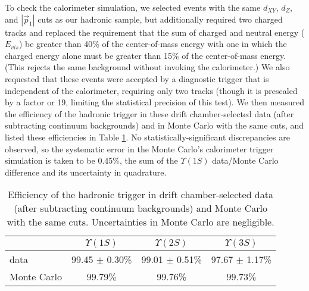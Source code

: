 \documentclass[aps,prd,preprint,superscriptaddress,tightenlines,nofootinbib,floatfix]{revtex4}
\begin{document}
To check the calorimeter simulation, we selected events with the same
$d_{XY}$, $d_Z$, and $|\vec{p}_1|$ cuts as our hadronic sample, but
additionally required two charged tracks and replaced the requirement
that the sum of charged and neutral energy ($E_{vis}$) be greater than
40\% of the center-of-mass energy with one in which the charged energy
alone must be greater than 15\% of the center-of-mass energy.  (This
rejects the same background without invoking the calorimeter.)  We
also requested that these events were accepted by a diagnostic trigger
that is independent of the calorimeter, requiring only two tracks
(though it is prescaled by a factor or 19, limiting the statistical
precision of this test).  We then measured the efficiency of the
hadronic trigger in these drift chamber-selected data (after
subtracting continuum backgrounds) and in Monte Carlo with the same
cuts, and listed these efficiencies in Table \ref{tab:cccheck}.  No
statistically-significant discrepancies are observed, so the
systematic error in the Monte Carlo's calorimeter trigger simulation
is taken to be 0.45\%, the sum of the $\Upsilon(1S)$ data/Monte Carlo
difference and its uncertainty in quadrature.

\begin{table}[t]
  \caption{\label{tab:cccheck} Efficiency of the hadronic trigger in
  drift chamber-selected data (after subtracting continuum
  backgrounds) and Monte Carlo with the same cuts.  Uncertainties in
  Monte Carlo are negligible.}
  \begin{center}
    \begin{tabular}{p{5 cm} c c c}
      \hline\hline
      & $\Upsilon(1S)$ & $\Upsilon(2S)$ & $\Upsilon(3S)$ \\\hline
      data & 99.45 $\pm$ 0.30\% & 99.01 $\pm$ 0.51\% & 97.67 $\pm$ 1.17\% \\
      Monte Carlo & 99.79\% & 99.76\% & 99.73\% \\\hline\hline
    \end{tabular}
  \end{center}
\end{table}
\end{document}
